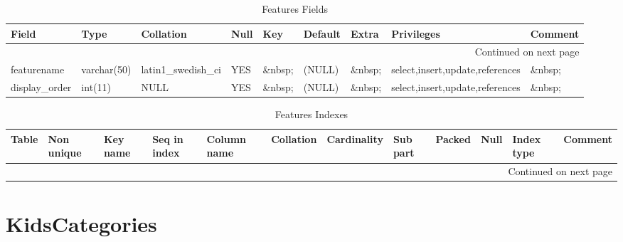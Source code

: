 \documentclass[tablesignature,landscape]{scrartcl}
\begin{document}
\begin{longtable}{|l|l|l|l|l|l|l|l|l|}
\caption{Features Fields} \label{tbl:featuresfields}\\
\hline
 Field             &  Type         &  Collation                &  Null     &  Key      &  Default  &  Extra              &  Privileges                       &  Comment \\
\hline
\endhead
\hline\multicolumn{9}{r}{Continued on next page}\
\endfoot
\endlastfoot
\hline
 featureid         &  int(11)      &  NULL                     &  \&nbsp;  &  PRI      &  (NULL)   &  auto\_{}increment  &  select,insert,update,references  &  \&nbsp;  \\
 featurename       &  varchar(50)  &  latin1\_{}swedish\_{}ci  &  YES      &  \&nbsp;  &  (NULL)   &  \&nbsp;            &  select,insert,update,references  &  \&nbsp;  \\
 display\_{}order  &  int(11)      &  NULL                     &  YES      &  \&nbsp;  &  (NULL)   &  \&nbsp;            &  select,insert,update,references  &  \&nbsp;  \\
\hline
\end{longtable}


\begin{longtable}{|l|l|l|l|l|l|l|l|l|l|l|l|}
\caption{Features Indexes} \label{tbl:featuresindexes}\\
\hline
 Table     &  Non unique  &  Key name  &  Seq in index  &  Column name  &  Collation  &  Cardinality  &  Sub part  &  Packed  &  Null     &  Index type  &  Comment \\
\hline
\endhead
\hline\multicolumn{12}{r}{Continued on next page}\
\endfoot
\endlastfoot
\hline
 Features  &           0  &  PRIMARY   &             1  &  featureid    &  A          &           12  &  (NULL)    &  (NULL)  &  \&nbsp;  &  BTREE       &  \&nbsp   \\
\hline
\end{longtable}
\section{KidsCategories}
\label{sec-4}
\end{document}
